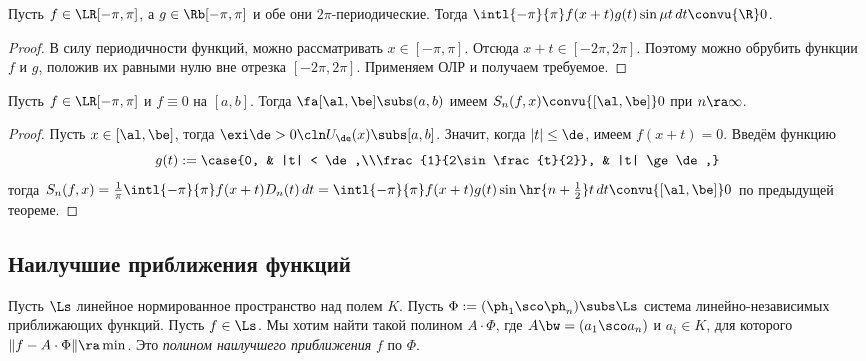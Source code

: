 \documentclass[a4paper]{article}
\newcommand{\intlpp}{\intl{-\pi}{\pi}}
\newcommand{\frpi}{\frac{1}{\pi}}
\begin{document}
\begin{theorem}
Пусть $f\in\LR[-\pi,\pi]$, а $g \in\Rb[-\pi,\pi]$ и обе они $2\pi$-периодические. Тогда $\intlpp
f(x+t)g(t)\sin \mu t \,d t \convu{\R} 0$.
\end{theorem}
\begin{proof}
В силу периодичности функций, можно рассматривать $x \in [-\pi,\pi]$. Отсюда $x + t \in [-2\pi,2\pi]$. Поэтому можно обрубить функции $f$ и $g$,
положив их равными нулю вне отрезка $[-2\pi,2\pi]$. Применяем ОЛР и получаем требуемое.
\end{proof}

\begin{theorem}
Пусть $f \in\LR[-\pi,\pi]$ и $f \equiv 0$ на $[a,b]$. Тогда $\fa [\al,\be] \subs (a,b)$ имеем
$S_n(f,x) \convu{[\al,\be]} 0$ при $n \ra \infty$.
\end{theorem}
\begin{proof}
Пусть $x \in [\al,\be]$, тогда $\exi \de > 0\cln U_\de(x) \subs [a,b]$. Значит, когда $|t| \le \de$,
имеем $f(x+t)= 0$. Введём функцию
$$g(t) := \case{0, & |t| < \de,\\\frac{1}{2\sin\frac{t}{2}}, & |t| \ge \de,}$$
тогда $S_n(f,x) = \frpi \intlpp f(x+t)D_n(t)\,d t = \intlpp f(x+t)g(t)\sin\hr{n +
\frac{1}{2}}t \,d t \convu{[\al,\be]} 0$ по предыдущей теореме.
\end{proof}

\subsection{Наилучшие приближения функций}

Пусть $\Ls$ линейное нормированное пространство над полем $K$. Пусть $\Phi := (\ph_1\sco\ph_n) \subs \Ls$
система линейно-независимых приближающих функций. Пусть $f \in \Ls$. Мы хотим найти такой полином
$A \cdot \Phi$, где $A \bw= (a_1\sco a_n)$ и $a_i \in K$, для которого $\|f - A\cdot \Phi\| \ra \min$.
Это \emph{полином наилучшего приближения} $f$ по $\Phi$.
\end{document}
